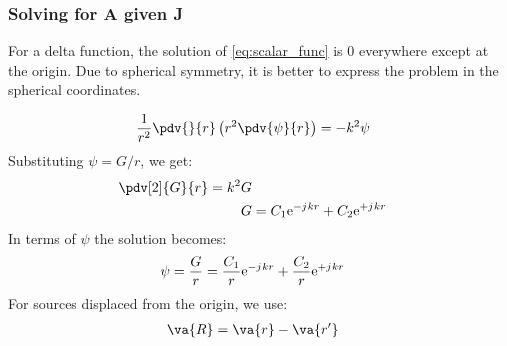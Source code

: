 \documentclass[10pt, compress]{beamer}
\newcommand{\e}{\mathrm{e}} %
\renewcommand{\j}{{j}\mkern1mu} %
\begin{document}
\begin{frame}
  \frametitle{Solving for A given J}  
  \begin{outline}
    \1 For a delta function, the solution of \ref{eq:scalar_func} is 0 everywhere except at the origin.
    \1 Due to spherical symmetry, it is better to express the problem in the spherical coordinates.
  \end{outline}
  \begin{align*}
\frac{1}{r^2}\pdv{}{r}\left(r^2 \pdv{\psi}{r}\right) &= -k^2 \psi
  \end{align*}
  Substituting $\psi = G/r$, we get:
  \begin{align*}
    \pdv[2]{G}{r} = k^2 G \\
    G &= C_1 \e^{-\j k r} + C_2 \e^{+\j k r}
  \end{align*}
  In terms of $\psi$ the solution becomes:
  \begin{align*}
    \psi = \frac{G}{r} &= \frac{C_1}{r} \e^{-\j k r} + \frac{C_2}{r} \e^{+\j k r}
  \end{align*}
  For sources displaced from the origin, we use:
  \begin{align*}
    \va{R} &= \va{r} - \va{r'}
  \end{align*}
\end{frame}
\end{document}
